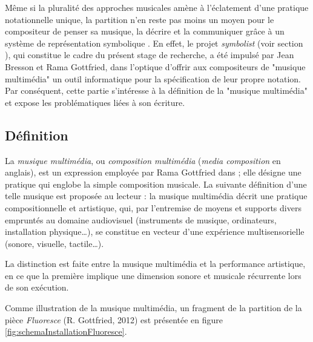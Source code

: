 Même si la pluralité des approches musicales amène à l'éclatement d'une pratique notationnelle unique, la partition n'en reste pas moins \og un moyen pour le compositeur de penser sa musique, la décrire et la communiquer grâce à un système de représentation symbolique \fg \cite{bresson2008}.
En effet, le projet \textit{symbolist} (voir section ), qui constitue le cadre du présent stage de recherche, a été impulsé par Jean Bresson et Rama Gottfried, dans l'optique d'offrir aux compositeurs de "musique multimédia" un outil informatique pour la spécification de leur propre notation.
Par conséquent, cette partie s'intéresse à la définition de la "musique multimédia" et expose les problématiques liées à son écriture.

\subsection{Définition}

La \emph{musique multimédia}, ou \emph{composition multimédia} (\textit{media composition} en anglais), est un expression employée par Rama Gottfried dans \cite{gottfried2017}; elle désigne une pratique qui englobe la simple composition musicale.
La suivante définition d'une telle musique est proposée au lecteur : la musique multimédia décrit une pratique compositionnelle et artistique, qui, par l'entremise de moyens et supports divers empruntés au domaine audiovisuel (instruments de musique, ordinateurs, installation physique…), se constitue en vecteur d'une expérience multisensorielle (sonore, visuelle, tactile…).

La distinction est faite entre la musique multimédia et la performance artistique, en ce que la première implique une dimension sonore et musicale récurrente lors de son exécution.

Comme illustration de la musique multimédia, un fragment de la partition de la pièce \textit{Fluoresce} (R. Gottfried, 2012) est présentée en figure \ref{fig:schemaInstallationFluoresce}.

